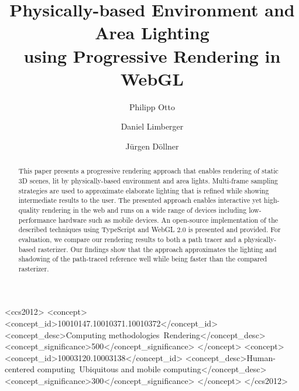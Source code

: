 \documentclass[sigconf,authorversion]{acmart}
\begin{document}
\title[Physically-based Environment and Area Lighting using Progressive Rendering in WebGL]{Physically-based Environment and Area Lighting\\using Progressive Rendering in WebGL}

\author{Philipp Otto}
\author{Daniel Limberger}
\author{J{\"u}rgen D{\"o}llner}

\renewcommand{\shortauthors}{P. Otto, D. Limberger, and J. D{\"o}llner.}

\begin{abstract}
This paper presents a progressive rendering approach that enables rendering of static 3D scenes, lit by physically-based environment and area lights.
Multi-frame sampling strategies are used to approximate elaborate lighting that is refined while showing intermediate results to the user.
The presented approach enables interactive yet high-quality rendering in the web and runs on a wide range of devices including low-performance hardware such as mobile devices.
An open-source implementation of the described techniques using TypeScript and WebGL 2.0 is presented and provided.
For evaluation, we compare our rendering results to both a path tracer and a physically-based rasterizer.
Our findings show that the approach approximates the lighting and shadowing of the path-traced reference well while being faster than the compared rasterizer.
\end{abstract}

\begin{CCSXML}
<ccs2012>
   <concept>
       <concept_id>10010147.10010371.10010372</concept_id>
       <concept_desc>Computing methodologies~Rendering</concept_desc>
       <concept_significance>500</concept_significance>
       </concept>
   <concept>
       <concept_id>10003120.10003138</concept_id>
       <concept_desc>Human-centered computing~Ubiquitous and mobile computing</concept_desc>
       <concept_significance>300</concept_significance>
       </concept>
 </ccs2012>
\end{CCSXML}
\end{document}
